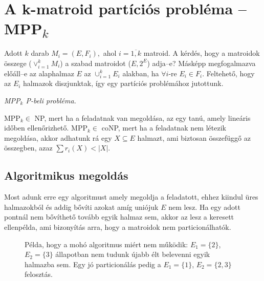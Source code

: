 \section{\texorpdfstring{A k-matroid partíciós probléma -- MPP\textsubscript{$k$}}
		 {A k-matroid partíciós probléma}}
			 
Adott $k$ darab $M_i = (E, F_i),$ ahol $i={\overline{1,k}}$ matroid. A kérdés,
hogy a matroidok összege ($\vee_{i=1}^{k}M_i$) a szabad matroidot ($E,2^E$)
adja--e? Másképp megfogalmazva előáll--e az alaphalmaz $E$ az $\cup_{i=1}^{k}
E_i$ alakban, ha $\forall i$-re $E_i \in F_i$. Feltehető, hogy az $E_i$ halmazok 
diszjunktak, így egy partíciós problémához jutottunk.

\vspace{0.4cm}
\emph{MPP$_k$ P-beli probléma.}
\vspace{0.4cm}

MPP$_k \in$ NP, mert ha a feladatnak van megoldása, az egy tanú, amely lineáris időben
ellenőrizhető. MPP$_k \in$ coNP, mert ha a feladatnak nem létezik megoldása, akkor
adhatunk rá egy $X \subseteq E$ halmazt, ami biztosan összefüggő az összegben, azaz 
$\sum r_i (X) < |X|$.

\subsection{Algoritmikus megoldás}

Most adunk erre egy algoritmust amely megoldja a feladatott, ehhez kiindul üres
halmazokból és addig bővíti azokat amíg uniójuk $E$ nem lesz. Ha egy adott
pontnál nem bővíthető tovább egyik halmaz sem, akkor az lesz a keresett ellenpélda, 
ami bizonyítás arra, hogy a matroidok nem particionálhatók.

\begin{figure}[htbp]
\caption{Példa, hogy a mohó algoritmus miért nem működik: 
		  $E_1 = \{2\}$, $E_2 = \{3\}$ állapotban nem tudunk újabb élt 
		  belevenni egyik halmazba sem. Egy jó particionálás pedig a 
		  $E_1 = \{ 1 \}$, $E_2 = \{ 2, 3 \}$ felosztás.}
\label{fig:MPPMohoNem}
\centering {} 
\end{figure}

